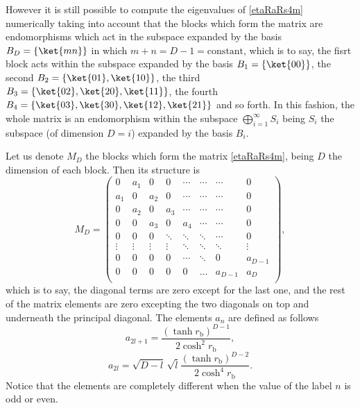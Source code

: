 However it is still possible to compute the eigenvalues of \eqref{etaRaRs4m} numerically taking into account that the blocks which form the matrix are  endomorphisms which act in the subspace expanded by the basis $B_{D}=\{\ket{mn}\}$ in which $m+n=D-1=\text{constant}$, which is to say, the fisrt block acts within the subspace expanded by the basis $B_1=\{\ket{00}\}$, the second $B_2=\{\ket{01},\ket{10}\}$, the third $B_3=\{\ket{02},\ket{20},\ket{11}\}$, the fourth $B_4=\{\ket{03},\ket{30},\ket{12},\ket{21}\}$ and so forth. In this fashion, the whole matrix is an endomorphism within the subspace $\bigoplus_{i=1}^\infty S_i$ being $S_i$ the subspace (of dimension $D=i$) expanded by the basis $B_i$.

Let us denote $M_D$ the blocks which form the matrix \eqref{etaRaRs4m}, being $D$ the dimension of each block. Then its structure is
\begin{equation}\label{blockss}
M_D=\left(\!
\begin{array}{cccccccc}
0  & a_1  & 0 & 0 & \cdots & \cdots& \cdots& 0 \\
a_1 & 0 & a_2 & 0 & \cdots & \cdots& \cdots & 0\\
0 & a_2 & 0 & a_3 & \cdots & \cdots& \cdots& 0\\
0 & 0 & a_3 &0 & a_4 & \cdots& \cdots& 0\\
0 & 0 & 0 &  \ddots &\ddots &  \ddots &\cdots& 0\\
\vdots  & \vdots  & \vdots  & \vdots  & \ddots  & \ddots  & \ddots  & \vdots \\
0 & 0 & 0 &  0 &\cdots&  \ddots &0& a_{D-1}\\
0 & 0 & 0 &  0 &0&  \dots &a_{D-1}& a_{D}\\
\end{array}\!\right),
\end{equation}
which is to say, the diagonal terms are zero except for the last one, and the rest of the matrix elements are zero excepting the two diagonals on top and underneath the principal diagonal. The elements $a_n$ are defined as follows
\begin{equation}
a_{2l+1}=\frac{(\tanh r_\text{b})^{D-1}}{2\cosh^2 r_\text{b}},
\end{equation}
\begin{equation}
a_{2l}=\sqrt{D-l}\,\sqrt{l}\frac{(\tanh r_\text{b})^{D-2}}{2\cosh^4r_\text{b}}.
\end{equation}
Notice that the elements are completely different when the value of the label $n$ is odd or even.

